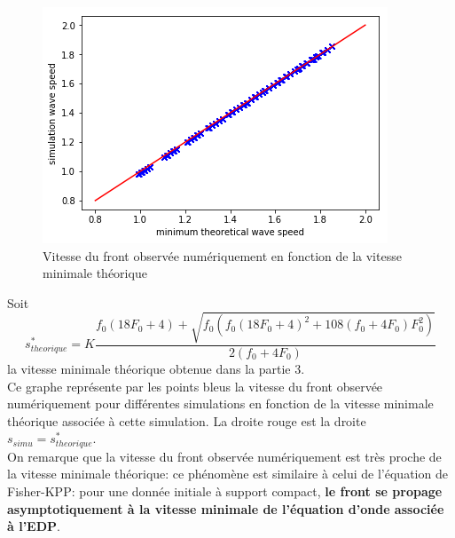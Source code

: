 \begin{figure}[hbt!]
\centering
\includegraphics[width=.7\textwidth]{Images/stheoriquevssimulations.png}
\caption{Vitesse du front observée numériquement en fonction de la vitesse minimale théorique}
\end{figure}
Soit \begin{equation*}
s^*_{theorique} =K\frac{f_0(18F_0+4)+\sqrt{f_0(f_0(18F_0+4)^2+108(f_0+4F_0)F_0^2)}}{2(f_0+4F_0)}\end{equation*} la vitesse minimale théorique obtenue dans la partie 3.\\
Ce graphe représente par les points bleus la vitesse du front observée numériquement pour différentes simulations en fonction de la vitesse minimale théorique associée à cette simulation. La droite rouge est la droite $s_{simu} = s^*_{theorique}$.\\
On remarque que la vitesse du front observée numériquement est très proche de la vitesse minimale théorique: ce phénomène est similaire à celui de l'équation de Fisher-KPP: pour une donnée initiale à support compact, \textbf{le front se propage asymptotiquement à la vitesse minimale de l'équation d'onde associée à l'EDP}.